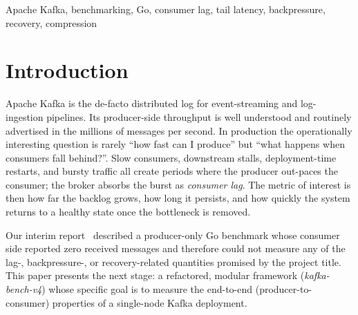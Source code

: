 \documentclass[conference]{IEEEtran}
\begin{document}
\begin{IEEEkeywords}
Apache Kafka, benchmarking, Go, consumer lag, tail latency,
backpressure, recovery, compression
\end{IEEEkeywords}

\section{Introduction}
Apache Kafka is the de-facto distributed log for event-streaming and
log-ingestion pipelines. Its producer-side throughput is well
understood and routinely advertised in the millions of messages per
second. In production the operationally interesting question is rarely
``how fast can I produce'' but ``what happens when consumers fall
behind?''. Slow consumers, downstream stalls, deployment-time
restarts, and bursty traffic all create periods where the producer
out-paces the consumer; the broker absorbs the burst as
\emph{consumer lag}. The metric of interest is then how far the
backlog grows, how long it persists, and how quickly the system
returns to a healthy state once the bottleneck is removed.

Our interim report~\cite{interim} described a producer-only Go
benchmark whose consumer side reported zero received messages and
therefore could not measure any of the lag-, backpressure-, or
recovery-related quantities promised by the project title. This paper
presents the next stage: a refactored, modular framework
(\emph{kafka-bench-v4}) whose specific goal is to measure the
end-to-end (producer-to-consumer) properties of a single-node Kafka
deployment.
\end{document}
